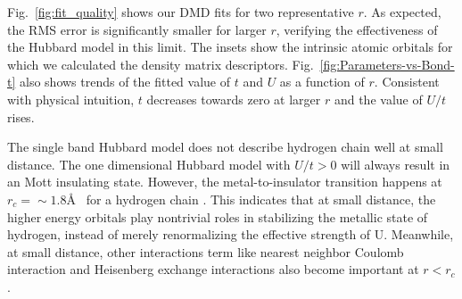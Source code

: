 Fig.~\ref{fig:fit_quality} shows our DMD fits for two representative $r$. As expected, the RMS error 
is significantly smaller for larger $r$, verifying the effectiveness of the Hubbard model 
in this limit. The insets show the intrinsic atomic orbitals for which we calculated the density matrix descriptors. Fig.~\ref{fig:Parameters-vs-Bond-t} also shows trends of the fitted value of $t$ 
and $U$ as a function of $r$. Consistent with physical intuition, $t$ decreases towards zero at larger $r$
and the value of $U/t$ rises. 

The single band Hubbard model does not describe hydrogen chain well at small distance. The one dimensional Hubbard model with $U/t>0$ will always result in an Mott insulating state. However, the metal-to-insulator transition happens at $r_c=\sim1.8$\AA~ for a hydrogen chain \cite{Stella2011}. This indicates that at small distance, the higher energy orbitals play nontrivial roles in stabilizing the metallic state of hydrogen, instead of merely renormalizing the effective strength of U. Meanwhile, at small distance, other interactions term like nearest neighbor Coulomb interaction and Heisenberg exchange interactions also become important at $r<r_c$ \cite{ZhengThesis}. 

